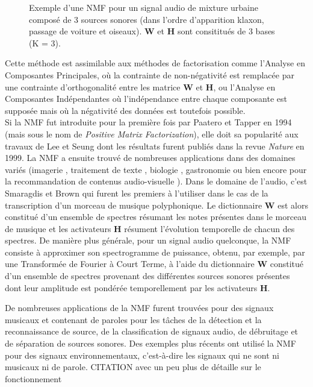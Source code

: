 \begin{figure}[t]
\centering
\caption{Exemple d'une NMF pour un signal audio de mixture urbaine composé de 3 sources sonores (dans l'ordre d'apparition klaxon, passage de voiture et oiseaux). $\mathbf{W}$ et $\mathbf{H}$ sont consititués de 3 bases (K = 3).}
\label{fig:ex_NMF}
\end{figure}


Cette méthode est assimilable aux méthodes de factorisation comme l'Analyse en Composantes Principales, où la contrainte de non-négativité est remplacée par une contrainte d'orthogonalité entre les matrice $\mathbf{W}$ et $\mathbf{H}$, ou l'Analyse en Composantes Indépendantes où l'indépendance entre chaque composante est supposée mais où la négativité des données est toutefois possible. \\


Si la NMF fut introduite pour la première fois par Paatero et Tapper \cite{paatero_positive_1994} en 1994 (mais sous le nom de \textit{Positive Matrix Factorization}), elle doit sa popularité aux travaux de Lee et Seung \cite{lee_learning_1999} dont les résultats furent publiés dans la revue \textit{Nature} en 1999. La NMF a ensuite trouvé de nombreuses applications dans des domaines variés 
(imagerie \cite{guillamet_introducing_2003} \cite{monga_robust_2007}, traitement de texte \cite{xu_document_2003} \cite{berry_email_2005}, biologie \cite{gao_improving_2005} \cite{chen_constrained_nodate}, gastronomie \cite{hawkins_clustering_2006} ou bien encore pour la recommandation de contenus audio-visuelle \cite{luo2014efficient}). Dans le domaine de l'audio, c'est Smaragdis et Brown \cite{smaragdis_non-negative_2003} qui furent les premiers à l'utiliser dans le cas de la transcription d'un morceau de musique polyphonique. Le dictionnaire $\mathbf{W}$ est alors constitué d'un ensemble de spectres résumant les notes présentes dans le morceau de musique et les activateurs $\mathbf{H}$ résument l'évolution temporelle de chacun des spectres. De manière plus générale, pour un signal audio quelconque, la NMF consiste à approximer son spectrogramme de puissance, obtenu, par exemple, par une Transformée de Fourier à Court Terme, à l'aide du dictionnaire $\textbf{W}$ constitué d'un ensemble de spectres provenant des différentes sources sonores présentes dont leur amplitude est pondérée temporellement par les activateurs $\textbf{H}$. 

De nombreuses applications de la NMF furent trouvées pour des signaux musicaux et contenant de paroles pour les tâches de la détection et la reconnaissance de source, de la classification de signaux audio, de débruitage et de séparation de sources sonores. Des exemples plus récents ont utilisé la NMF pour des signaux environnementaux, c'est-à-dire les signaux qui ne sont ni musicaux ni de parole. 
 CITATION avec un peu plus de détaille sur le fonctionnement

